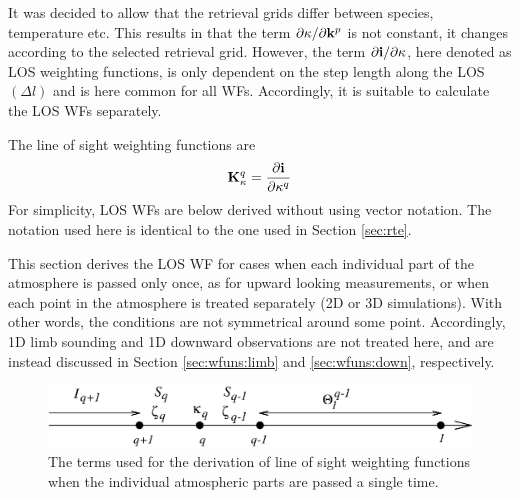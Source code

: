   It was decided to allow that the retrieval grids differ between
  species, temperature etc. This results in that the term $\partial
  \kappa/ \partial \mathbf{k}^p$ is not constant, it changes according to
  the selected retrieval grid. However, the term $\partial\mathbf{i}/
  \partial \kappa$, here denoted as LOS weighting functions, is only
  dependent on the step length along the LOS $(\Delta l)$ and is here
  common for all WFs. Accordingly, it is suitable to calculate the LOS
  WFs separately.
  
  



 \label{sec:wfuns:loswfs}

 The line of sight weighting functions are
 \begin{equation}
   \mathbf{K}_{\kappa}^q =  \frac{\partial\mathbf{i}}{\partial \kappa^q}
  \label{eq:wfuns:loswfs}
 \end{equation}
 For simplicity, LOS WFs are below derived without using vector
 notation. The notation used here is identical to the one used in
 Section \ref{sec:rte}.


 \label{sec:wfuns:single}
 
 This section derives the LOS WF for cases when each individual part
 of the atmosphere is passed only once, as for upward looking
 measurements, or when each point in the atmosphere is treated
 separately (2D or 3D simulations). With other words, the conditions
 are not symmetrical around some point. Accordingly, 1D limb sounding
 and 1D downward observations are not treated here, and are instead
 discussed in Section \ref{sec:wfuns:limb} and \ref{sec:wfuns:down},
 respectively.

 \begin{figure}[t]
  \begin{center}
   \includegraphics*[width=0.95\hsize]{Figs/wf1.eps}
   \caption{The terms used for the derivation of line of sight weighting
            functions when the individual atmospheric parts are passed a
            single time.}
   \label{fig:wfuns:single}  
  \end{center}
 \end{figure}

